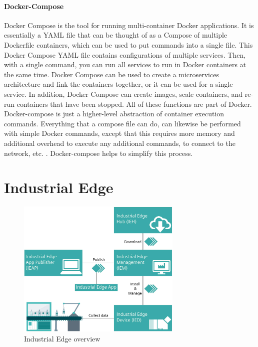 		\paragraph{Docker-Compose}
		Docker Compose is the tool for running multi-container Docker applications. It is essentially a YAML file that can be thought of as a Compose of multiple Dockerfile containers, which can be used to put commands into a single file. This Docker Compose YAML file contains configurations of multiple services. Then, with a single command, you can run all services to run in Docker containers at the same time.
		Docker Compose can be used to create a microservices architecture and link the containers together, or it can be used for a single service. In addition, Docker Compose can create images, scale containers, and re-run containers that have been stopped. All of these functions are part of Docker. Docker-compose is just a higher-level abstraction of container execution commands. Everything that a compose file can do, can likewise be performed with simple Docker commands, except that this requires more memory and additional overhead to execute any additional commands, to connect to the network, etc. . Docker-compose helps to simplify this process.
				
	\section{Industrial Edge}
	\label{Grundlagen:IndustrialEdge}
		
		\begin{figure}[h]
			\centering
			\includegraphics[width=0.70\textwidth]{"Bilder/Edge_uebersicht.jpg"}
			\caption{Industrial Edge overview \cite{siemensIEM_gettingStarted}}
			\label{fig:Grundlagen:IndustrialEdge:Ueberblick}					
		\end{figure}
	
